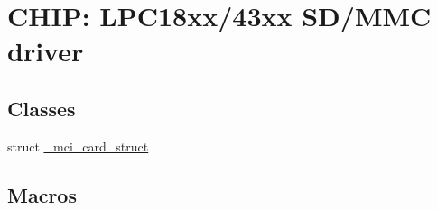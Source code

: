 \hypertarget{group___s_d_m_m_c__18_x_x__43_x_x}{}\section{C\+H\+IP\+: L\+P\+C18xx/43xx S\+D/\+M\+MC driver}
\label{group___s_d_m_m_c__18_x_x__43_x_x}
\subsection*{Classes}
\begin{DoxyCompactItemize}
\item 
struct \hyperlink{struct__mci__card__struct}{\+\_\+mci\+\_\+card\+\_\+struct}
\end{DoxyCompactItemize}
\subsection*{Macros}
